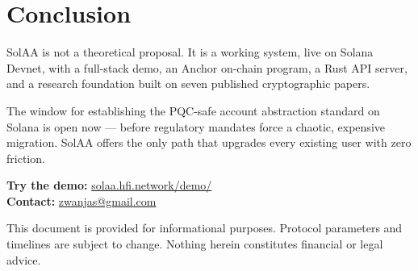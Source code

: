 \documentclass[11pt, a4paper]{article}
\begin{document}
\section{Conclusion}

SolAA is not a theoretical proposal. It is a working system, live on Solana Devnet,
with a full-stack demo, an Anchor on-chain program, a Rust API server, and a research
foundation built on seven published cryptographic papers.

The window for establishing the PQC-safe account abstraction standard on Solana is
open now --- before regulatory mandates force a chaotic, expensive migration. SolAA
offers the only path that upgrades every existing user with zero friction.

\begin{greenbox}
  \textbf{Try the demo:} \href{https://solaa.hfi.network/demo/}{solaa.hfi.network/demo/}\\
  \textbf{Contact:} \href{mailto:zwanjas@gmail.com}{zwanjas@gmail.com}
\end{greenbox}

\vspace{2em}
\noindent\color{text-muted}\small
This document is provided for informational purposes. Protocol parameters and timelines
are subject to change. Nothing herein constitutes financial or legal advice.
\end{document}
